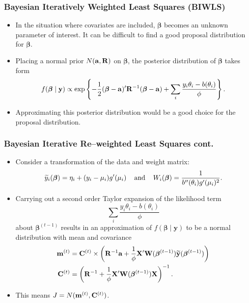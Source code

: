 \documentclass[black]{beamer}
\begin{document}
\begin{frame}
\frametitle{Bayesian Iteratively Weighted Least Squares (BIWLS)}
\begin{itemize}
\item In the situation where covariates are included, $\boldsymbol\beta$ becomes an unknown parameter of interest.  It can be difficult to find a good proposal distribution for $\boldsymbol\beta$.
\vspace{0.2cm}
\item Placing a normal prior $N({\bf a},{\bf R})$ on $\boldsymbol\beta$, the posterior distribution of $\boldsymbol\beta$ takes form
\[
f(\boldsymbol\beta \mid \mathbf{y}) \propto \exp\left\{ -\frac{1}{2}(\boldsymbol\beta - {\bf a})'{\bf R}^{-1}(\boldsymbol\beta - {\bf a}) + \sum_i \frac{y_i\theta_i - b(\theta_i)}{\phi} \right\}.
\]
\item Approximating this posterior distribution would be a good choice for the proposal distribution.
\end{itemize} 
\end{frame}

\begin{frame}
\frametitle{Bayesian Iterative Re--weighted Least Squares cont.}
\begin{itemize}
\item Consider a transformation of the data and weight matrix:
\[
\widetilde{y}_i(\boldsymbol\beta) = \eta_i + (y_i - \mu_i)g'(\mu_i) \hspace{4mm}\text{and}\hspace{4mm}W_i(\boldsymbol\beta) = \frac{1}{b''(\theta_i)g'(\mu_i)^2}.
\]
\item Carrying out a second order Taylor expansion of the likelihood term
\[
\sum_i \frac{y_i\theta_i - b(\theta_i)}{\phi}
\]
about $\boldsymbol\beta^{(t-1)}$ results in an approximation of $f(\boldsymbol\beta\mid \mathbf{y})$ to be a normal distribution with mean and covariance
\begin{align*}
{\bf m}^{(t)} &= {\bf C}^{(t)}\times\left({\bf R}^{-1}{\bf a} + \frac{1}{\phi}{\bf X}'{\bf W}(\boldsymbol\beta^{(t-1)})\widetilde{{\bf y}}(\boldsymbol\beta^{(t-1)})\right) \\
{\bf C}^{(t)} &= \left({\bf R}^{-1} + \frac{1}{\phi}{\bf X}'{\bf W}(\boldsymbol\beta^{(t-1)}){\bf X}\right)^{-1}.
\end{align*}
\item This means $J = N({\bf m}^{(t)}, {\bf C}^{(t)})$.
\end{itemize}
\end{frame}
\end{document}
